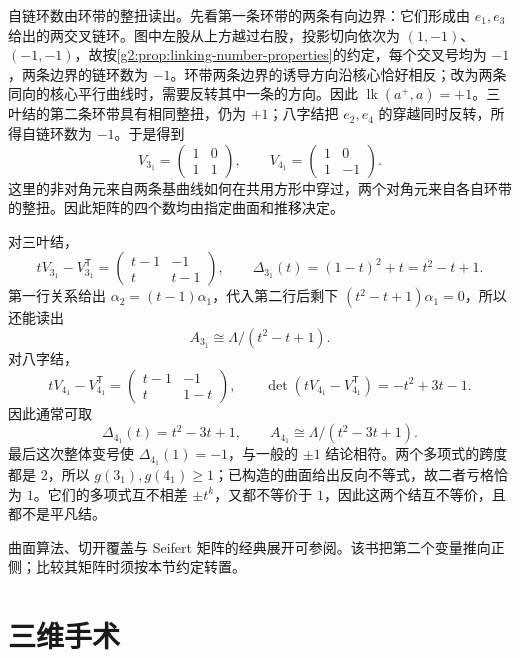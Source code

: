 自链环数由环带的整扭读出。先看第一条环带的两条有向边界：它们形成由 \(e_1,e_3\) 给出的两交叉链环。图中左股从上方越过右股，投影切向依次为 \((1,-1)\)、\((-1,-1)\)，故按\cref{g2:prop:linking-number-properties}的约定，每个交叉号均为 \(-1\)，两条边界的链环数为 \(-1\)。环带两条边界的诱导方向沿核心恰好相反；改为两条同向的核心平行曲线时，需要反转其中一条的方向。因此 \(\operatorname{lk}(a^+,a)=+1\)。三叶结的第二条环带具有相同整扭，仍为 \(+1\)；八字结把 \(e_2,e_4\) 的穿越同时反转，所得自链环数为 \(-1\)。于是得到
\begin{equation}\label{g2:eq:trefoil-figure-eight-seifert}
	V_{3_1}=\begin{pmatrix}1&0\\1&1\end{pmatrix},
	\qquad
	V_{4_1}=\begin{pmatrix}1&0\\1&-1\end{pmatrix}.
\end{equation}
这里的非对角元来自两条基曲线如何在共用方形中穿过，两个对角元来自各自环带的整扭。因此矩阵的四个数均由指定曲面和推移决定。

对三叶结，
\[
	tV_{3_1}-V_{3_1}^{\mathsf T}
	=\begin{pmatrix}t-1&-1\\t&t-1\end{pmatrix},
	\qquad
	\Delta_{3_1}(t)=(1-t)^2+t=t^2-t+1.
\]
第一行关系给出 \(\alpha_2=(t-1)\alpha_1\)，代入第二行后剩下 \((t^2-t+1)\alpha_1=0\)，所以还能读出
\[
	A_{3_1}\cong\Lambda/(t^2-t+1).
\]
对八字结，
\[
	tV_{4_1}-V_{4_1}^{\mathsf T}
	=\begin{pmatrix}t-1&-1\\t&1-t\end{pmatrix},
	\qquad
	\det(tV_{4_1}-V_{4_1}^{\mathsf T})=-t^2+3t-1.
\]
因此通常可取
\[
	\Delta_{4_1}(t)=t^2-3t+1,
	\qquad A_{4_1}\cong\Lambda/(t^2-3t+1).
\]
最后这次整体变号使 \(\Delta_{4_1}(1)=-1\)，与一般的 \(\pm1\) 结论相符。两个多项式的跨度都是 \(2\)，所以 \(g(3_1),g(4_1)\geq1\)；已构造的曲面给出反向不等式，故二者亏格恰为 \(1\)。它们的多项式互不相差 \(\pm t^k\)，又都不等价于 \(1\)，因此这两个结互不等价，且都不是平凡结。

曲面算法、切开覆盖与 Seifert 矩阵的经典展开可参阅\cite[第5章第A、C节；第8章第A--C节]{Rolfsen2003Knots}。该书把第二个变量推向正侧；比较其矩阵时须按本节约定转置。

\section{三维手术}
\label{g2:sec:A03}

